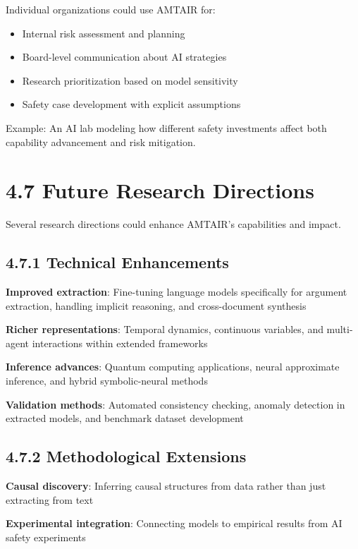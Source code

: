 \documentclass[
  11pt,
  letterpaper,
  openany]{book}
\providecommand{\tightlist}{%
  \setlength{\itemsep}{0pt}\setlength{\parskip}{0pt}}
\begin{document}
Individual organizations could use AMTAIR for:

\begin{itemize}
\tightlist
\item
  Internal risk assessment and planning
\item
  Board-level communication about AI strategies
\item
  Research prioritization based on model sensitivity
\item
  Safety case development with explicit assumptions
\end{itemize}

Example: An AI lab modeling how different safety investments affect both
capability advancement and risk mitigation.

\section{4.7 Future Research Directions}\label{sec-future-research}

Several research directions could enhance AMTAIR's capabilities and
impact.

\subsection{4.7.1 Technical Enhancements}\label{sec-technical-future}

\textbf{Improved extraction}: Fine-tuning language models specifically
for argument extraction, handling implicit reasoning, and cross-document
synthesis

\textbf{Richer representations}: Temporal dynamics, continuous
variables, and multi-agent interactions within extended frameworks

\textbf{Inference advances}: Quantum computing applications, neural
approximate inference, and hybrid symbolic-neural methods

\textbf{Validation methods}: Automated consistency checking, anomaly
detection in extracted models, and benchmark dataset development

\subsection{4.7.2 Methodological
Extensions}\label{sec-methodological-future}

\textbf{Causal discovery}: Inferring causal structures from data rather
than just extracting from text

\textbf{Experimental integration}: Connecting models to empirical
results from AI safety experiments
\end{document}
